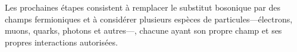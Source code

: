 Les prochaines étapes consistent à remplacer le substitut bosonique par des champs fermioniques et à considérer plusieurs espèces de particules---électrons, muons, quarks, photons et autres---, chacune ayant son propre champ et ses propres interactions autorisées.

\begin{classroomqa}
\end{classroomqa}